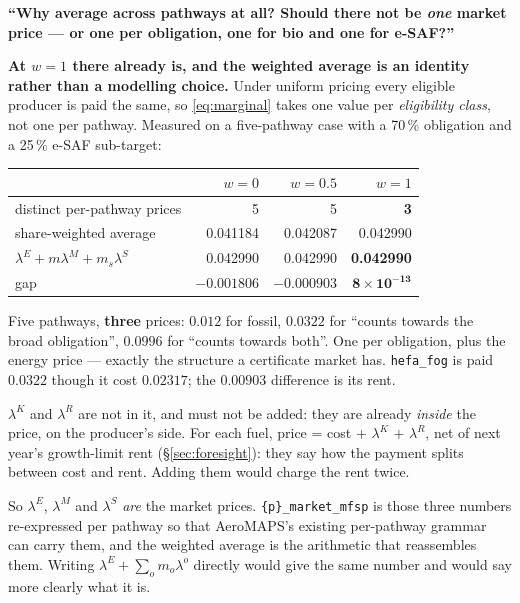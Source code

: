 \documentclass[11pt,a4paper]{article}
\newcommand{\var}[1]{\texttt{\small #1}}
\begin{document}
\begin{keybox}
\textbf{``Why average across pathways at all? Should there not be \emph{one} market price
--- or one per obligation, one for bio and one for e-SAF?''}

\medskip
\textbf{At $w=1$ there already is, and the weighted average is an identity rather than a
modelling choice.} Under uniform pricing every eligible producer is paid the same, so
\eqref{eq:marginal} takes one value per \emph{eligibility class}, not one per pathway.
Measured on a five-pathway case with a 70\,\% obligation and a 25\,\% e-SAF sub-target:

\medskip
\begin{center}\small
\begin{tabular}{@{}lrrr@{}}
\toprule
 & $w = 0$ & $w = 0.5$ & $w = 1$ \\
\midrule
distinct per-pathway prices & 5 & 5 & \textbf{3} \\
share-weighted average & 0.041184 & 0.042087 & 0.042990 \\
$\lambda^{E} + m\lambda^{M} + m_s\lambda^{S}$ & 0.042990 & 0.042990 & \textbf{0.042990} \\
gap & $-0.001806$ & $-0.000903$ & $\mathbf{8\times10^{-13}}$ \\
\bottomrule
\end{tabular}
\end{center}
\medskip

Five pathways, \textbf{three} prices: $0.012$ for fossil, $0.0322$ for ``counts towards the
broad obligation'', $0.0996$ for ``counts towards both''. One per obligation, plus the
energy price --- exactly the structure a certificate market has. \var{hefa\_fog} is paid
$0.0322$ though it cost $0.02317$; the $0.00903$ difference is its rent.

\medskip
$\lambda^{K}$ and $\lambda^{R}$ are not in it, and must not be added: they are already
\emph{inside} the price, on the producer's side. For each fuel, price = cost +
$\lambda^{K}$ + $\lambda^{R}$, net of next year's growth-limit rent (\S\ref{sec:foresight}):
they say how the payment splits between cost and rent. Adding them would charge the rent
twice.

\medskip
So $\lambda^{E}$, $\lambda^{M}$ and $\lambda^{S}$ \emph{are} the market prices.
\var{\{p\}\_market\_mfsp} is those three numbers re-expressed per pathway so that
AeroMAPS's existing per-pathway grammar can carry them, and the weighted average is the
arithmetic that reassembles them. Writing $\lambda^{E} + \sum_o m_o \lambda^{o}$ directly
would give the same number and would say more clearly what it is.


\end{keybox}
\end{document}
